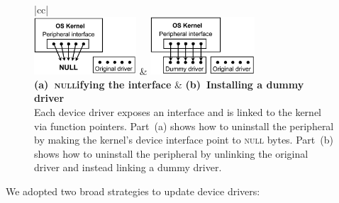 \begin{figure}[t!]
\begin{center}
\footnotesize
\begin{tabular}{|cc|}
\hline
{}\\
\includegraphics[keepaspectratio=true,height=0.85in]{figures/driver-null.png} & 
\includegraphics[keepaspectratio=true,height=0.85in]{figures/driver-dummy.png}\\
\textbf{(a)~\textsc{null}ifying the interface} &
\textbf{(b)~Installing a dummy driver}\\
{\small Each device driver exposes an interface and is linked to the kernel via
function pointers.  Part~(a) shows how to uninstall the peripheral by making
the kernel's device interface point to \textsc{null} bytes.  Part~(b) shows how
to uninstall the peripheral by unlinking the original driver and instead
linking a dummy driver.}\\
\hline
\end{tabular}
\end{center}
\indent\vspace{-0.7cm}
{\label{figure:uninstall}}
\indent\vspace{-0.25cm}
\end{figure}

We adopted two broad strategies to update device drivers:  

